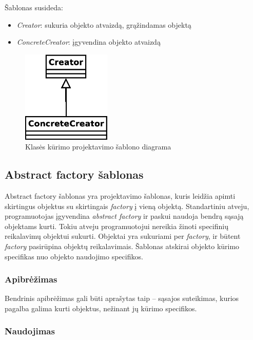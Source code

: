 \documentclass[10pt]{IEEEtran}
\begin{document}
				Šablonas susideda:

				\begin{itemize}
					\item \textit{Creator}: sukuria objekto atvaizdą, grąžindamas objektą
					\item \textit{ConcreteCreator}: įgyvendina objekto atvaizdą
				\end{itemize}

				\begin{figure}[t]
					\centering
					\includegraphics[width=160px]{diagrams/creational_pattern_class.eps}
					\caption{Klasės kūrimo projektavimo šablono diagrama}
					\label{fig:creational_class_pattern}
				\end{figure}

		\subsection{Abstract factory šablonas}

			Abstract factory šablonas yra projektavimo šablonas, kuris leidžia apimti skirtingus objektus su skirtingais \textit{factory} į vieną objektą. Standartiniu atveju, programuotojas įgyvendina \textit{abstract factory} ir paskui naudoja bendrą sąsają objektams kurti. Tokiu atveju programuotojui nereikia žinoti specifinių reikalavimų objektui sukurti. Objektai yra sukuriami per \textit{factory}, ir būtent \textit{factory} pasirūpina objektų reikalavimais. Šablonas atskirai objekto kūrimo specifikas nuo objekto naudojimo specifikos.

			\subsubsection{Apibrėžimas}

				Bendrinis apibrėžimas gali būti aprašytas taip -- sąsajos suteikimas, kurios pagalba galima kurti objektus, nežinant jų kūrimo specifikos.

			\subsubsection{Naudojimas}
\end{document}
